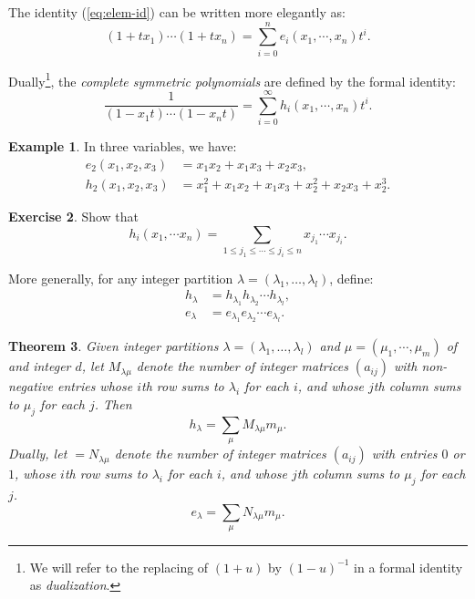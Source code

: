 \documentclass[11pt]{amsart}
\newtheorem{theorem}{Theorem}[subsection]
\theoremstyle{definition}
\theoremstyle{example}
\newtheorem{example}[theorem]{Example}
\newtheorem{exercise}[theorem]{Exercise}
\begin{document}
The identity (\ref{eq:elem-id}) can be written more elegantly as:
\begin{displaymath}
  (1+t x_1) \dotsb (1+tx_n) = \sum_{i=0}^n e_i(x_1,\dotsb, x_n)t^i.
\end{displaymath}

Dually\footnote{We will refer to the replacing of $(1+u)$ by $(1-u)^{-1}$ in a formal identity as \emph{dualization}.}, the \emph{complete symmetric polynomials} are defined by the formal identity:
\begin{displaymath}
  \frac 1{(1-x_1t)\dotsb (1-x_nt)} = \sum_{i=0}^\infty h_i(x_1,\dotsb, x_n)t^i.
\end{displaymath}
\begin{example}
  In three variables, we have:
  \begin{align*}
    e_2(x_1,x_2,x_3) & = x_1x_2 + x_1x_3 + x_2x_3,\\
    h_2(x_1,x_2,x_3) & = x_1^2 + x_1x_2 + x_1x_3 + x_2^2 + x_2x_3 + x_2^3.
  \end{align*}
\end{example}
\begin{exercise}
  Show that
  \begin{displaymath}
    h_i(x_1,\dotsb x_n) = \sum_{1\leq j_1\leq \dotsb \leq j_i\leq n} x_{j_1}\dotsb x_{j_i}.
  \end{displaymath}
\end{exercise}
More generally, for any integer partition $\lambda=(\lambda_1,\dotsc, \lambda_l)$, define:
\begin{align*}
  h_\lambda &= h_{\lambda_1} h_{\lambda_2}\dotsb h_{\lambda_l},\\
  e_\lambda &= e_{\lambda_1} e_{\lambda_2}\dotsb e_{\lambda_l}.
\end{align*}
\begin{theorem}
  Given integer partitions $\lambda=(\lambda_1,\dotsc,\lambda_l)$ and $\mu=(\mu_1,\dotsb, \mu_m)$ of and integer $d$, let $M_{\lambda\mu}$ denote the number of integer matrices $(a_{ij})$ with non-negative entries whose $i$th row sums to $\lambda_i$ for each $i$, and whose $j$th column sums to $\mu_j$ for each $j$.
  Then
  \begin{displaymath}
    h_\lambda = \sum_\mu M_{\lambda\mu} m_\mu.
  \end{displaymath}
  Dually, let $=N_{\lambda\mu}$ denote the number of integer matrices $(a_{ij})$ with entries $0$ or $1$, whose $i$th row sums to $\lambda_i$ for each $i$, and whose $j$th column sums to $\mu_j$ for each $j$.
  \begin{displaymath}
    e_\lambda = \sum_\mu N_{\lambda\mu} m_\mu.
  \end{displaymath}
\end{theorem}
\end{document}
